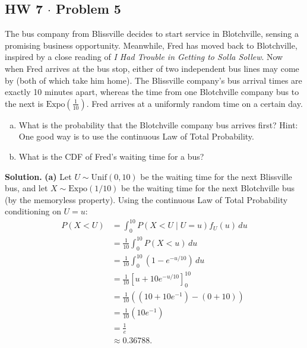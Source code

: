 \documentclass[11pt,a4paper]{article}
\begin{document}
\vspace{10pt}
\subsection{HW 7 $\cdot$ Problem 5}
\begin{tcolorbox}[title={HW 7 $\cdot$ Problem 5}]
The bus company from Blissville decides to start service in Blotchville, sensing a promising business opportunity. Meanwhile, Fred has moved back to Blotchville, inspired by a close reading of \textit{I Had Trouble in Getting to Solla Sollew}. Now when Fred arrives at the bus stop, either of two independent bus lines may come by (both of which take him home). The Blissville company's bus arrival times are exactly 10 minutes apart, whereas the time from one Blotchville company bus to the next is $\text{Expo}\left(\frac{1}{10}\right)$. Fred arrives at a uniformly random time on a certain day.
\begin{enumerate}[(a)]
\item What is the probability that the Blotchville company bus arrives first?
Hint: One good way is to use the continuous Law of Total Probability.
\item What is the CDF of Fred's waiting time for a bus?
\end{enumerate}
\end{tcolorbox}

\noindent \textbf{Solution.} \textbf{(a)} Let $U \sim \text{Unif}(0, 10)$ be the waiting time for the next Blissville bus, and let $X \sim \text{Expo}(1/10)$ be the waiting time for the next Blotchville bus (by the memoryless property). Using the continuous Law of Total Probability conditioning on $U = u$:
\begin{align*}
P(X < U) &= \int_{0}^{10} P(X < U \mid U = u) f_U(u) \, du \\
&= \frac{1}{10} \int_{0}^{10} P(X < u) \, du \\
&= \frac{1}{10} \int_{0}^{10} \left( 1 - e^{-u/10} \right) \, du \\
&= \frac{1}{10} \left[ u + 10 e^{-u/10} \right]_{0}^{10} \\
&= \frac{1}{10} \left( (10 + 10 e^{-1}) - (0 + 10) \right) \\
&= \frac{1}{10} (10 e^{-1}) \\
&= \frac{1}{e} \\
&\approx 0.36788.
\end{align*}
\end{document}
